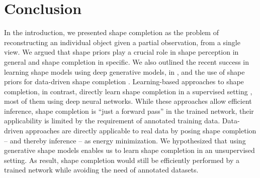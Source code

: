 \chapter{Conclusion}
\label{ch:conclusion}

In the introduction, we presented shape completion as the problem of reconstructing
an individual object given a partial observation, \eg from a single view.
We argued that shape priors play a crucial role in shape perception
in general \cite{Pizlo:2007,Pizlo:2010} and shape completion in specific.
We also outlined the recent success in learning shape models using deep generative models,
\eg in \cite{GirdharGupta:2016,BrockWeston:2016,WuSongXiao:2015,WuTenenbaum:2016},
and the use of shape priors for data-driven shape completion
\cite{DameReid:2013,EngelmannStuecklerLeibe:2016,EngelmannLeibe:2017}.
Learning-based approaches to shape completion, in contrast, directly
learn shape completion in a supervised setting
\cite{SmithMeger:2017,DaiNiessner:2016,SharmaFritz:2016,
FanSuGuibas:2016,RezendeHeess:2016,RieglerGeiger:2017}, most of them using deep neural networks.
While these approaches allow efficient inference, \ie shape completion is
``just a forward pass'' in the trained network, their applicability is limited
by the requirement of annotated training data. Data-driven approaches
are directly applicable to real data by posing shape completion -- and thereby
inference -- as energy minimization. We hypothesized that using generative
shape models enables us to learn shape completion in an unsupervised setting.
As result, shape completion would still be efficiently performed by a trained
network while avoiding the need of annotated datasets.

